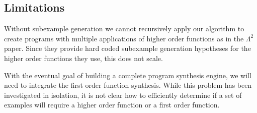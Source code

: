 \subsection{Limitations}

Without subexample generation we cannot recursively apply our algorithm to create programs with multiple applications of higher order functions as in the   $\Lambda^2$ paper\cite{isil}. Since they provide hard coded subexample generation hypotheses for the higher order functions they use, this does not scale.

With the eventual goal of building a complete program synthesis engine, we will need to integrate the first order function synthesis. While this problem has been investigated in isolation, it is not clear how to efficiently determine if  a set of examples will require a higher order function or a first order function.